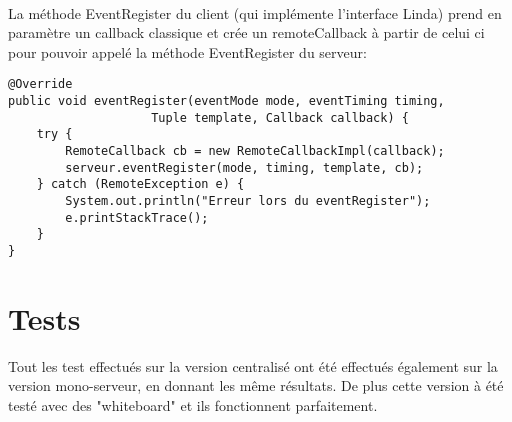 \documentclass{report}
\begin{document}
\paragraph{}La méthode EventRegister du client (qui implémente l'interface Linda) prend en paramètre un callback classique et crée un remoteCallback à partir de celui ci pour pouvoir appelé la méthode EventRegister du serveur:
\begin{lstlisting}
@Override
public void eventRegister(eventMode mode, eventTiming timing, 
					Tuple template, Callback callback) {
	try {
		RemoteCallback cb = new RemoteCallbackImpl(callback);
		serveur.eventRegister(mode, timing, template, cb);
	} catch (RemoteException e) {
		System.out.println("Erreur lors du eventRegister");
		e.printStackTrace();
	}
}
\end{lstlisting}
\section{Tests}
Tout les test effectués sur la version centralisé ont été effectués également sur la version mono-serveur, en donnant les même résultats.\newline
De plus cette version à été testé avec des "whiteboard" et ils fonctionnent parfaitement.
\end{document}
